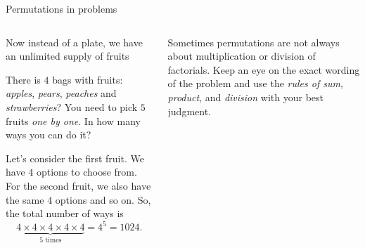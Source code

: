 \documentclass[9pt,aspectratio=169]{beamer}
\begin{document}
\begin{frame}{Permutations in problems}
  \begin{columns}[T]
    \begin{column}{0.5\textwidth}
      Now instead of a plate, we have an unlimited supply of fruits
      \begin{problem}
        There is $4$ bags with fruits: \emph{apples}, \emph{pears}, \emph{peaches} and \emph{strawberries}? You need to pick $5$ fruits \emph{one by one}. In how many ways you can do it?
      \end{problem}

      \begin{nscenter}
      \end{nscenter}

      Let’s consider the first fruit. We have $4$ options to choose from. For the second fruit, we also have the same $4$ options and so on. So, the total number of ways is 
      \[
        \underbrace{4 \times 4 \times 4 \times 4 \times 4}_\text{$5$ times} = 4^5 = 1024.
      \]
    \end{column}
    \begin{column}{0.5\textwidth}
      \begin{definition}
        Sometimes permutations are not always about multiplication or division of factorials. Keep an eye on the exact wording of the problem and use the \emph{rules of sum}, \emph{product}, and \emph{division} with your best judgment.
      \end{definition}
    

\end{column}
\end{columns}
\end{frame}
\end{document}
